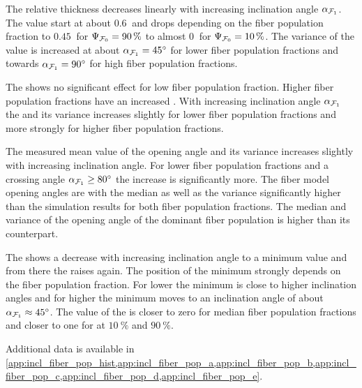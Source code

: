 \par
The relative thickness \trel{} decreases linearly with increasing inclination angle $\textnormal{$\alpha$}_{\textnormal{$\mathcal{F}_1$}}$.
The \trel{} value start at about $\SI{0.6}{}$ and drops depending on the fiber population fraction \modelPsi{} to $\SI{0.45}{}$ for $\textnormal{$\Psi_{\textnormal{$\mathcal{F}_0$}}$}=\SI{90}{\percent}$ to almost $\SI{0}{}$ for $\textnormal{$\Psi_{\textnormal{$\mathcal{F}_0$}}$}=\SI{10}{\percent}$.
The variance of the \trel{} value is increased at about $\textnormal{$\alpha$}_{\textnormal{$\mathcal{F}_1$}}=\SI{45}{\degree}$ for lower fiber population fractions and towards $\textnormal{$\alpha$}_{\textnormal{$\mathcal{F}_1$}}=\SI{90}{\degree}$ for high fiber population fractions.
\par
The \rvalue{} shows no significant effect for low fiber population fraction.
Higher fiber population fractions have an increased \rvalue{}.
With increasing inclination angle $\textnormal{$\alpha$}_{\textnormal{$\mathcal{F}_1$}}$ the \rvalue{} and its variance increases slightly for lower fiber population fractions and more strongly for higher fiber population fractions.
\par
The measured mean value of the opening angle \openingAngle{} and its variance increases slightly with increasing inclination angle.
For lower fiber population fractions and a crossing angle $\textnormal{$\alpha$}_{\textnormal{$\mathcal{F}_1$}} \geq \SI{80}{\degree}$ the increase is significantly more.
The fiber model opening angles are with the median as well as the \bvariance{} variance significantly higher than the simulation results for both fiber population fractions.
The median and \bvariance{} variance of the opening angle of the dominant fiber population is higher than its counterpart.
\par
The \accvalue{} shows a decrease with increasing inclination angle to a minimum value and from there the \accvalue{} raises again.
The position of the minimum strongly depends on the fiber population fraction.
For lower \modelPsi{} the minimum is close to higher inclination angles and for higher \modelPsi{} the minimum moves to an inclination angle of about $\textnormal{$\alpha$}_{\textnormal{$\mathcal{F}_1$}} \approx \SI{45}{\degree}$.
The value of the \accvalue{} is closer to zero for median fiber population fractions and closer to one for \modelPsi{} at $\SI{10}{\percent}$ and $\SI{90}{\percent}$.
\par
% 
Additional data is available in \cref{app:incl_fiber_pop_hist,app:incl_fiber_pop_a,app:incl_fiber_pop_b,app:incl_fiber_pop_c,app:incl_fiber_pop_d,app:incl_fiber_pop_e}.
%
%
%
